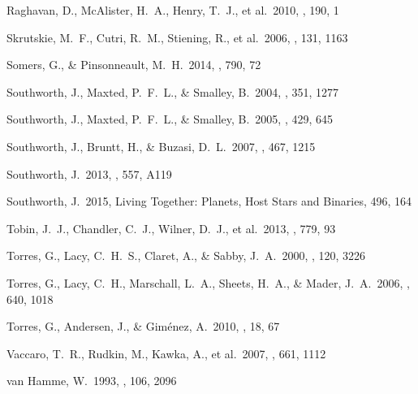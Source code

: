 \documentclass[fleqn,usenatbib]{mnras}
\begin{document}
\begin{thebibliography}{99}
 Raghavan, D., McAlister, H.~A., Henry, T.~J., et al.\ 2010, \apjs, 190, 1 


 Skrutskie, M.~F., Cutri, R.~M., Stiening, R., et al.\ 2006, \aj, 131, 1163 

 Somers, G., \& Pinsonneault, M.~H.\ 2014, \apj, 790, 72 

 Southworth, J., Maxted, P.~F.~L., \& Smalley, B.\ 2004, \mnras, 351, 1277 

 Southworth, J., Maxted, P.~F.~L., \& Smalley, B.\ 2005, \aap, 429, 645 

 Southworth, J., Bruntt, H., \& Buzasi, D.~L.\ 2007, \aap, 467, 1215 

 Southworth, J.\ 2013, \aap, 557, A119 

 Southworth, J.\ 2015, Living Together: Planets, Host Stars and Binaries, 496, 164 

 Tobin, J.~J., Chandler, C.~J., Wilner, D.~J., et al.\ 2013, \apj, 779, 93 

 Torres, G., Lacy, C.~H.~S., Claret, A., \& Sabby, J.~A.\ 2000, \aj, 120, 3226 

 Torres, G., Lacy, C.~H., Marschall, L.~A., Sheets, H.~A., \& Mader, J.~A.\ 2006, \apj, 640, 1018 

 Torres, G., Andersen, J., \& Gim{\'e}nez, A.\ 2010, \aapr, 18, 67 

 Vaccaro, T.~R., Rudkin, M., Kawka, A., et al.\ 2007, \apj, 661, 1112 

 van Hamme, W.\ 1993, \aj, 106, 2096 


\end{thebibliography}
\end{document}
